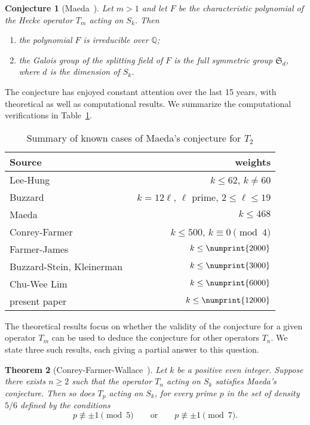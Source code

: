 \documentclass[11pt]{article}
\theoremstyle{plain}
\newtheorem{theorem}{Theorem}[section]
\newtheorem{conjecture}[theorem]{Conjecture}
\theoremstyle{definition}
\theoremstyle{remark}
\numberwithin{equation}{section}
\newcommand{\QQ}{\mathbb{Q}}
\renewcommand{\SS}{\mathfrak{S}}
\newcommand{\bound}{\numprint{12000}}
\begin{document}
\begin{conjecture}[Maeda~\cite{HidaMaeda}]
  Let $m>1$ and 
  let $F$ be the characteristic polynomial of the Hecke operator $T_m$ acting
  on $S_k$.  Then 
  \begin{enumerate}
    \item the polynomial $F$ is irreducible over $\QQ$;
    \item the Galois group of the splitting field of $F$ is the full symmetric
      group $\SS_d$, where $d$ is the dimension of $S_k$.
  \end{enumerate}
\end{conjecture}

The conjecture has enjoyed constant attention over the last 15 years, with
theoretical as well as computational results.  We summarize the computational
verifications in Table~\ref{tbl:known}.

\begin{table}[h]
  \begin{center}
\begin{tabular}{l|r}
  Source & weights\\ \hline
  Lee-Hung~\cite{LeeHung} & $k\leq 62$, $k\neq 60$ \\
  Buzzard~\cite{Buzzard} & $k=12\ell$, $\ell$ prime, $2\leq\ell\leq 19$ \\
  Maeda~\cite{HidaMaeda} & $k\leq 468$ \\
  Conrey-Farmer~\cite{ConreyFarmer} & $k\leq 500$, $k\equiv 0\pmod 4$  \\
  Farmer-James~\cite{FarmerJames} & $k\leq \numprint{2000}$  \\
  Buzzard-Stein, Kleinerman~\cite{Kleinerman} & $k\leq\numprint{3000}$ \\
  Chu-Wee Lim~\cite{Lim} & $k\leq\numprint{6000}$ \\
  present paper & $k\leq\bound$  \\
\end{tabular}
\end{center}
\caption{Summary of known cases of Maeda's conjecture for $T_2$}
\label{tbl:known}
\end{table}

The theoretical results focus on whether the validity of the conjecture for
a given operator $T_m$ can be used to deduce the conjecture for other
operators $T_n$.  We state three such results, each giving a partial answer to
this question.

\begin{theorem}[Conrey-Farmer-Wallace~\cite{ConreyFarmerWallace}]
  \label{thm:CFW}
  Let $k$ be a positive even integer.  Suppose there exists $n\geq 2$ such
  that the operator $T_n$ acting on $S_k$ satisfies Maeda's conjecture.  Then
  so does $T_p$ acting on $S_k$, for every prime $p$ in the set of density
  $5/6$ defined by the conditions
  \begin{equation*}
    p\not\equiv \pm 1\pmod{5}\qquad\text{or}\qquad
    p\not\equiv \pm 1\pmod{7}.
  \end{equation*}
\end{theorem}
\end{document}
